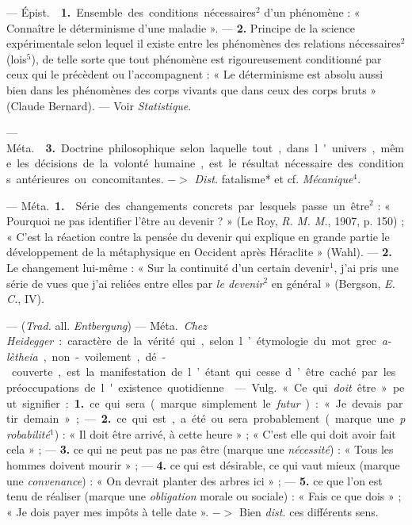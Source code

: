 \begin{itemize}[leftmargin=1cm, label=, itemsep=1pt]
 — \si{Épist.}  {\bf 1.} Ensemble des conditions nécessaires$^2$
d’un phénomène : « Connaître le
déterminisme d’une maladie ». —
 {\bf 2.} Principe de la science expérimentale selon lequel il existe entre
les phénomènes des relations nécessaires$^2$ (lois$^5$), de telle sorte que tout
phénomène est rigoureusement conditionné par ceux qui le précèdent
ou l’accompagnent : « Le déterminisme est absolu aussi bien dans les
phénomènes des corps vivants que
dans ceux des corps bruts » (Claude
Bernard). — Voir {\it Statistique}.

— \si{Méta.}  {\bf 3.} Doctrine philosophique selon laquelle tout, dans
l'univers, même les décisions de la
volonté humaine, est le résultat nécessaire des conditions antérieures
ou concomitantes. $->$ {\it Dist.} fatalisme* et cf. {\it Mécanique}$^4$.

 — \si{Méta.} {\bf 1.}  Série des changements concrets par lesquels passe
un être$^2$ : « Pourquoi ne pas identifier l’être au devenir ? » (Le Roy,
{\it R. M. M.}, 1907, p. 150) ; « C’est la
réaction contre la pensée du devenir
qui explique en grande partie le
développement de la métaphysique
en Occident après Héraclite »
(Wahl). — {\bf 2.}  Le changement lui-même : « Sur la continuité d’un certain devenir$^1$, j'ai pris une série de
vues que j'ai reliées entre elles par
{\it le devenir}$^2$ en général » (Bergson,
{\it E. C.}, IV).

 — ({\it Trad.} all. {\it Entbergung})
— \si{Méta.} {\it Chez Heidegger} : caractère
de la vérité qui, selon l’étymologie
du mot grec {\it a-lètheia}, non-voilement, dé-couverte, est la manifestation de l’étant qui cesse d’être
caché par les préoccupations de
l'existence quotidienne.

 — \si{Vulg.} « Ce qui {\it doit}
être » peut signifier : {\bf 1.} ce qui sera
(marque simplement le {\it futur}) : « Je
devais partir demain » ; — {\bf 2.} ce qui
est, a été ou sera probablement
(marque une {\it probabilité}$^1$) : « Il doit
être arrivé, à cette heure » ; « C’est
elle qui doit avoir fait cela » ; — {\bf 3.} ce
qui ne peut pas ne pas être (marque
une {\it nécessité}) : « Tous les hommes
doivent mourir » ; — {\bf 4.} ce qui est
désirable, ce qui vaut mieux (marque
une {\it convenance}) : « On devrait
planter des arbres ici » ; — {\bf 5.} ce que
l’on est tenu de réaliser (marque une
{\it obligation} morale ou sociale) : « Fais
ce que dois » ; « Je dois payer mes
impôts à telle date ». $->$ Bien {\it dist.}
ces différents sens.


\end{itemize}
